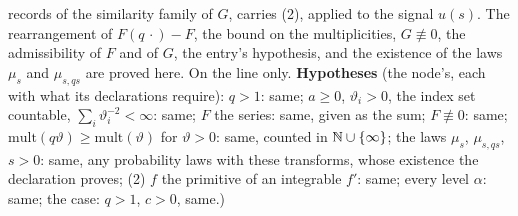 \begin{proposition}
{records of the similarity family of $G$, carries (2), applied to the signal $u(s)$. The
rearrangement of $F(q\,\cdot) - F$, the bound on the multiplicities, $G \not\equiv 0$, the
admissibility of $F$ and of $G$, the entry's hypothesis, and the existence of the laws $\mu_s$ and
$\mu_{s,qs}$ are proved here. On the line only. \textbf{Hypotheses} (the node's, each with what its
declarations require): $q > 1$: same; $a \ge 0$, $\vartheta_i > 0$, the index set countable,
$\sum_i\vartheta_i^{-2} < \infty$: same; $F$ the series: same, given as the sum; $F \not\equiv 0$:
same; $\mathrm{mult}(q\vartheta) \ge \mathrm{mult}(\vartheta)$ for $\vartheta > 0$: same, counted in
$\mathbb{N} \cup \{\infty\}$; the laws $\mu_s$, $\mu_{s,qs}$, $s > 0$: same, any probability laws with these
transforms, whose existence the declaration proves; (2) $f$ the primitive of an integrable $f'$:
same; every level $\alpha$: same; the \Matern{} case: $q > 1$, $c > 0$, same.)}
\end{proposition}

